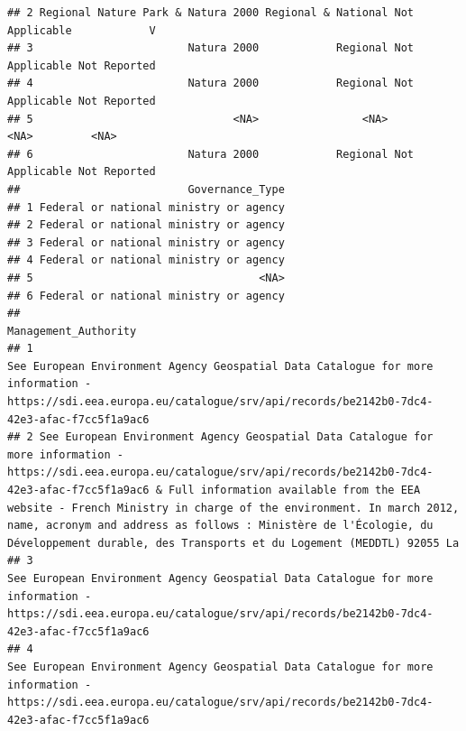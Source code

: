 \documentclass[
]{article}
\begin{document}
\begin{verbatim}
## 2 Regional Nature Park & Natura 2000 Regional & National Not Applicable            V
## 3                        Natura 2000            Regional Not Applicable Not Reported
## 4                        Natura 2000            Regional Not Applicable Not Reported
## 5                               <NA>                <NA>           <NA>         <NA>
## 6                        Natura 2000            Regional Not Applicable Not Reported
##                          Governance_Type
## 1 Federal or national ministry or agency
## 2 Federal or national ministry or agency
## 3 Federal or national ministry or agency
## 4 Federal or national ministry or agency
## 5                                   <NA>
## 6 Federal or national ministry or agency
##                                                                                                                                                                                                                                                                                                                                                                                                                   Management_Authority
## 1                                                                                                                                                                                                                                                            See European Environment Agency Geospatial Data Catalogue for more information - https://sdi.eea.europa.eu/catalogue/srv/api/records/be2142b0-7dc4-42e3-afac-f7cc5f1a9ac6
## 2 See European Environment Agency Geospatial Data Catalogue for more information - https://sdi.eea.europa.eu/catalogue/srv/api/records/be2142b0-7dc4-42e3-afac-f7cc5f1a9ac6 & Full information available from the EEA website - French Ministry in charge of the environment. In march 2012, name, acronym and address as follows : Ministère de l'Écologie, du Développement durable, des Transports et du Logement (MEDDTL) 92055 La
## 3                                                                                                                                                                                                                                                            See European Environment Agency Geospatial Data Catalogue for more information - https://sdi.eea.europa.eu/catalogue/srv/api/records/be2142b0-7dc4-42e3-afac-f7cc5f1a9ac6
## 4                                                                                                                                                                                                                                                            See European Environment Agency Geospatial Data Catalogue for more information - https://sdi.eea.europa.eu/catalogue/srv/api/records/be2142b0-7dc4-42e3-afac-f7cc5f1a9ac6

\end{verbatim}
\end{document}
